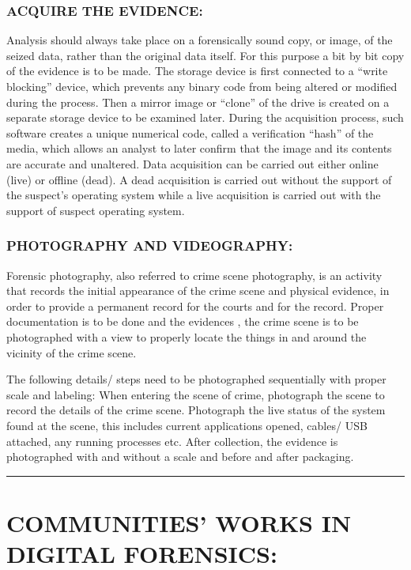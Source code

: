 \documentclass[10pt,british,english]{article}
\begin{document}
\subsubsection{ACQUIRE THE EVIDENCE:}

Analysis should always take place on a forensically sound copy, or
image, of the seized data, rather than the original data itself. For
this purpose a bit by bit copy of the evidence is to be made. The
storage device is first connected to a \textquotedblleft write blocking\textquotedblright{}
device, which prevents any binary code from being altered or modified
during the process. Then a mirror image or \textquotedblleft clone\textquotedblright{}
of the drive is created on a separate storage device to be examined
later. During the acquisition process, such software creates a unique
numerical code, called a verification \textquotedblleft hash\textquotedblright{}
of the media, which allows an analyst to later confirm that the image
and its contents are accurate and unaltered. Data acquisition can
be carried out either online (live) or offline (dead). A dead acquisition
is carried out without the support of the suspect\textquoteright s
operating system while a live acquisition is carried out with the
support of suspect operating system.

\subsubsection{PHOTOGRAPHY AND VIDEOGRAPHY:}

Forensic photography, also referred to crime scene photography, is
an activity that records the initial appearance of the crime scene
and physical evidence, in order to provide a permanent record for
the courts and for the record. Proper documentation is to be done
and the evidences , the crime scene is to be photographed with a view
to properly locate the things in and around the vicinity of the crime
scene.

The following details/ steps need to be photographed sequentially
with proper scale and labeling: When entering the scene of crime,
photograph the scene to record the details of the crime scene. Photograph
the live status of the system found at the scene, this includes current
applications opened, cables/ USB attached, any running processes etc.
After collection, the evidence is photographed with and without a
scale and before and after packaging.

\rule[0.5ex]{1\columnwidth}{1pt}

\section{COMMUNITIES\textquoteright{} WORKS IN DIGITAL FORENSICS:}
\end{document}
